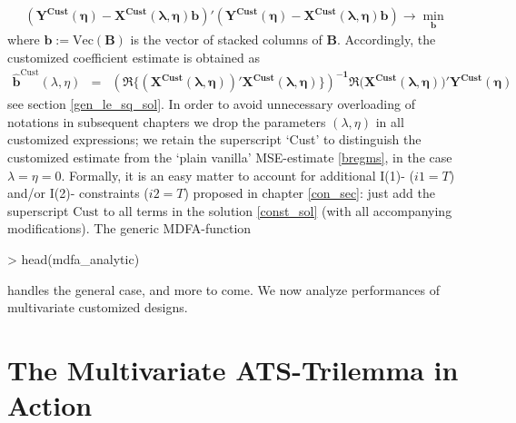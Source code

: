 \documentclass[a4paper]{book}
\begin{document}
\begin{eqnarray}\label{regcust}
(\mathbf{Y^{\textrm{Cust}}(\eta)-\mathbf{X}^{\textrm{Cust}}(\lambda,\eta)b})'(\mathbf{Y^{\textrm{Cust}}(\eta)-\mathbf{X}^{\textrm{Cust}}(\lambda,\eta)b})\to\min_{\mathbf{b}}
\end{eqnarray}
where $\mathbf{b}:=\textrm{Vec}(\mathbf{B})$ is the vector of stacked columns of $\mathbf{B}$. Accordingly, the customized coefficient estimate is obtained as 
\begin{eqnarray}\label{bregcust}
\mathbf{\hat{b}}^{\textrm{Cust}}(\lambda,\eta)&=&\mathbf{\left(\Re\Bigg\{(\mathbf{X}^{\textrm{Cust}}(\lambda,\eta))' \mathbf{X}^{\textrm{Cust}}(\lambda,\eta)\Bigg\}\right)^{-1}\Re(\mathbf{X}^{\textrm{Cust}}(\lambda,\eta)})'
\mathbf{Y^{\textrm{Cust}}(\eta)}
\end{eqnarray}
see section \ref{gen_le_sq_sol}. In order to avoid unnecessary overloading of notations in subsequent chapters we drop the parameters $(\lambda,\eta)$ in all customized expressions; we retain the superscript `Cust' to distinguish the customized estimate from the `plain vanilla' MSE-estimate \ref{bregms}, in the case $\lambda=\eta=0$.  Formally, it is an easy matter to account for additional I(1)- ($i1=T$) and/or I(2)- constraints ($i2=T$) proposed in chapter \ref{con_sec}: just add the superscript $\textrm{Cust}$ to all terms in the solution \ref{const_sol} (with all accompanying modifications). The generic MDFA-function 
\begin{Schunk}
\begin{Sinput}
> head(mdfa_analytic)
\end{Sinput}
\begin{Soutput}
1 function (K, L, lambda, weight_func, Lag, Gamma, eta, cutoff,              
2     i1, i2, weight_constraint, lambda_cross, lambda_decay, lambda_smooth,  
3     lin_eta, shift_constraint, grand_mean, b0_H0, c_eta, weights_only = F, 
4     weight_structure, white_noise, synchronicity, lag_mat)                 
5 {                                                                          
6     weight_target <- weight_func[, 1]                                      
\end{Soutput}
\end{Schunk}
handles the general case, and more to come. We now analyze performances of multivariate customized designs. 




\section{The Multivariate ATS-Trilemma in Action}\label{mul_ats_tr_i_a}
\end{document}
